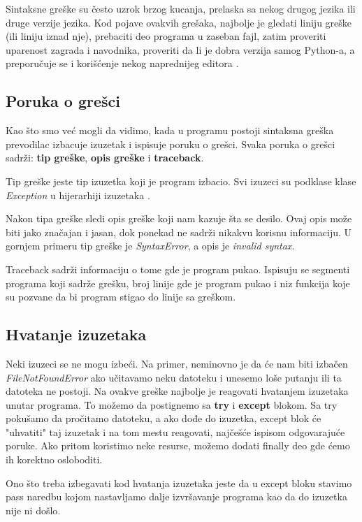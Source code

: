 \documentclass[a4paper]{article}
\begin{document}
Sintaksne greške su često uzrok brzog kucanja, prelaska sa nekog drugog jezika ili druge verzije jezika. Kod pojave ovakvih grešaka, najbolje je gledati liniju greške (ili liniju iznad nje), prebaciti deo programa u zaseban fajl, zatim proveriti uparenost zagrada i navodnika, proveriti da li je dobra verzija samog Python-a, a preporučuje se i korišćenje nekog naprednijeg editora \cite{proPyDeb}.
\subsection{Poruka o grešci}
Kao što smo već mogli da vidimo, kada u programu postoji sintaksna greška prevodilac izbacuje izuzetak i ispisuje poruku o grešci. Svaka poruka o grešci sadrži: \textbf{tip greške}, \textbf{opis greške} i \textbf{traceback}.

Tip greške jeste tip izuzetka koji je program izbacio. Svi izuzeci su podklase klase \emph{Exception} u hijerarhiji izuzetaka \cite{excDocPyt}.

Nakon tipa greške sledi opis greške koji nam kazuje šta se desilo. Ovaj opis može biti jako značajan i jasan, dok ponekad ne sadrži nikakvu korisnu informaciju. U gornjem primeru tip greške je \emph{SyntaxError}, a opis je \emph{invalid syntax}.

Traceback sadrži informaciju o tome gde je program pukao. Ispisuju se segmenti programa koji sadrže grešku, broj linije gde je program pukao i niz funkcija koje su pozvane da bi program stigao do linije sa greškom.
\subsection{Hvatanje izuzetaka}
Neki izuzeci se ne mogu izbeći. Na primer, neminovno je da će nam biti izbačen \emph{FileNotFoundError} ako učitavamo neku datoteku i unesemo loše putanju ili ta datoteka ne postoji. Na ovakve greške najbolje je reagovati hvatanjem izuzetaka unutar programa. To možemo da postignemo sa \textbf{try} i \textbf{except} blokom. Sa try pokušamo da pročitamo datoteku, a ako dođe do izuzetka, except blok će "uhvatiti" taj izuzetak i na tom mestu reagovati, najčešće ispisom odgovarajuće poruke. Ako pritom koristimo neke resurse, možemo dodati finally deo gde ćemo ih korektno osloboditi.

Ono što treba izbegavati kod hvatanja izuzetaka jeste da u except bloku stavimo pass naredbu kojom nastavljamo dalje izvršavanje programa kao da do izuzetka nije ni došlo\cite{proPyDeb}.
\end{document}

